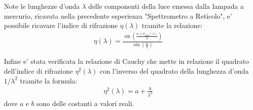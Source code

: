Note le lunghezze d'onda $\lambda$ delle componenti della luce emessa dalla lampada a mercurio, ricavata nella precedente esperienza "Spettrometro a Reticolo", e' possibile ricavare l'indice di rifrazione $\eta (\lambda)$ tramite la relazione:
\begin{align}
	\eta (\lambda) = 
	\frac{
		\sin{
			\left(
				\frac{
					\alpha + \sigma_{min} (\lambda)
				}{
					2
				}
			\right)
		}
	}
	{\sin{
		\left(
			\frac{\alpha}{2}
		\right)
		}
	}
\end{align}

Infine e' stata verificata la relazione di Cauchy che mette in relazione il quadrato dell'indice di rifrazione $\eta^2 (\lambda)$ con l'inverso del quadrato della lunghezza d'onda $1/ \lambda^2$ tramite la formula:
\begin{align}
	\eta^2 (\lambda) = a + \frac{b}{\lambda^2}
\end{align}
dove $a$ e $b$ sono delle costanti a valori reali.